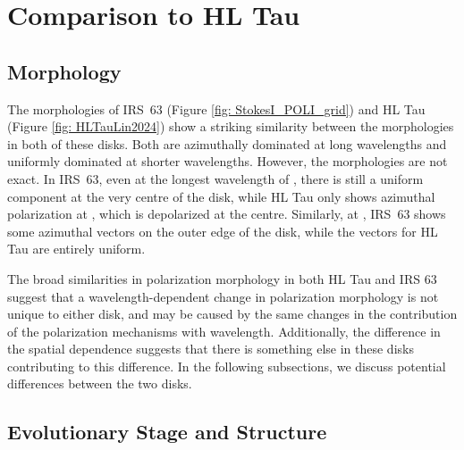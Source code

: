 \section{Comparison to HL Tau}


\subsection{Morphology}

The morphologies of IRS~63 (Figure \ref{fig: StokesI_POLI_grid}) and HL Tau (Figure \ref{fig: HLTauLin2024}) show a striking similarity between the morphologies in both of these disks. Both are azimuthally dominated at long wavelengths and uniformly dominated at shorter wavelengths. However, the morphologies are not exact. In IRS~63, even at the longest wavelength of \bfourNS, there is still a uniform component at the very centre of the disk, while HL Tau only shows azimuthal polarization at \bfourNS, which is depolarized at the centre. Similarly, at \bsevenNS, IRS~63 shows some azimuthal vectors on the outer edge of the disk, while the vectors for HL Tau are entirely uniform. 


The broad similarities in polarization morphology in both HL Tau and IRS 63 suggest that a wavelength-dependent change in polarization morphology is not unique to either disk, and may be caused by the same changes in the contribution of the polarization mechanisms with wavelength. Additionally, the difference in the spatial dependence suggests that there is something else in these disks contributing to this difference. In the following subsections, we discuss potential differences between the two disks.


\subsection{Evolutionary Stage and Structure}



